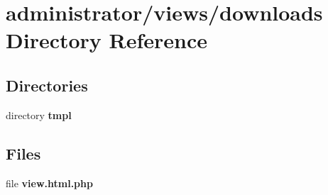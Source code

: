 \section{administrator/views/downloads Directory Reference}
\label{dir_19d77e566e62b856788d5c57f497b1f6}
\subsection*{Directories}
\begin{DoxyCompactItemize}
\item 
directory \textbf{ tmpl}
\end{DoxyCompactItemize}
\subsection*{Files}
\begin{DoxyCompactItemize}
\item 
file \textbf{ view.\+html.\+php}
\end{DoxyCompactItemize}
